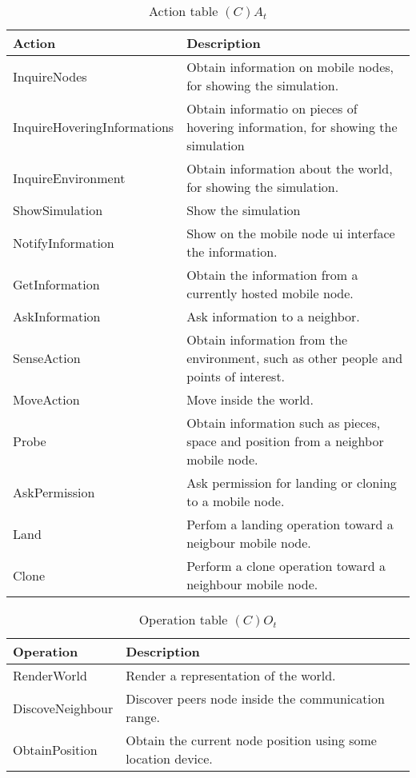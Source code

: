 \begin{table}[H]
	\centering
	\begin{tabular}{|p{5cm}|p{7cm}|}
			\hline
			\textbf{Action} & \textbf{Description} \\
      \hline
      InquireNodes & Obtain information on mobile nodes, for showing the simulation. \\
      \hline
      InquireHoveringInformations & Obtain informatio on pieces of hovering
                                    information, for showing the simulation\\
      \hline
      InquireEnvironment & Obtain information about the world, for showing the simulation. \\
      \hline
      ShowSimulation & Show the simulation\\
      \hline
      NotifyInformation & Show on the mobile node ui interface the information. \\
      \hline
      GetInformation & Obtain the information from a currently hosted mobile node. \\
      \hline
      AskInformation & Ask information to a neighbor.\\
      \hline
      SenseAction & Obtain information from the environment, such as other people and points of interest.\\
      \hline
      MoveAction & Move inside the world.\\
      \hline
      Probe & Obtain information such as pieces, space and position from a
      neighbor mobile node. \\
      \hline
      AskPermission & Ask permission for landing or cloning to a mobile node. \\
      \hline
      Land & Perfom a landing operation toward a neigbour mobile node.\\
      \hline
      Clone & Perform a clone operation toward a neighbour mobile node.\\
      \hline
		\end{tabular}
	\caption{Action table $(C)A_t$}
	\label{tab:cat}
\end{table}

\begin{table}[H]
	\centering
	\begin{tabular}{|p{4cm}|p{8cm}|}
			\hline
			\textbf{Operation} & \textbf{Description} \\
			\hline
			RenderWorld & Render a representation of the world. \\
			\hline
			DiscoveNeighbour & Discover peers node inside the communication range. \\
			\hline
			ObtainPosition & Obtain the current node position using some location
			device. \\
			\hline
		\end{tabular}
	\caption{Operation table $(C)O_t$}
	\label{tab:cot}
\end{table}

